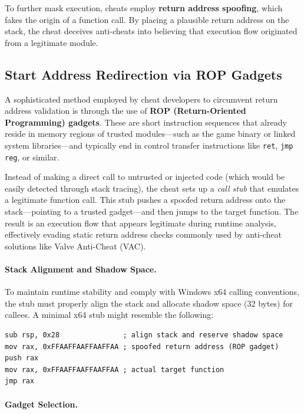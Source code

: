 To further mask execution, cheats employ \textbf{return address spoofing}, which fakes the origin of a function call. By placing a plausible return address on the stack, the cheat deceives anti-cheats into believing that execution flow originated from a legitimate module.



\subsection*{Start Address Redirection via ROP Gadgets}

A sophisticated method employed by cheat developers to circumvent return address validation is through the use of \textbf{ROP (Return-Oriented Programming) gadgets}. These are short instruction sequences that already reside in memory regions of trusted modules—such as the game binary or linked system libraries—and typically end in control transfer instructions like \texttt{ret}, \texttt{jmp reg}, or similar.

Instead of making a direct call to untrusted or injected code (which would be easily detected through stack tracing), the cheat sets up a \emph{call stub} that emulates a legitimate function call. This stub pushes a spoofed return address onto the stack—pointing to a trusted gadget—and then jumps to the target function. The result is an execution flow that appears legitimate during runtime analysis, effectively evading static return address checks commonly used by anti-cheat solutions like Valve Anti-Cheat (VAC).

\paragraph{Stack Alignment and Shadow Space.} To maintain runtime stability and comply with Windows x64 calling conventions, the stub must properly align the stack and allocate shadow space (32 bytes) for callees. A minimal x64 stub might resemble the following:
\begin{lstlisting}[style=asmstyle]
sub rsp, 0x28               ; align stack and reserve shadow space
mov rax, 0xFFAAFFAAFFAAFFAA ; spoofed return address (ROP gadget)
push rax
mov rax, 0xFFAAFFAAFFAAFFAA ; actual target function
jmp rax
\end{lstlisting}

\paragraph{Gadget Selection.} 

